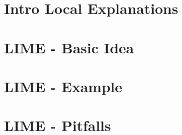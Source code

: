 \documentclass[11pt,compress,t,n
otes=noshow, aspectratio=169, xcolor=table]{beamer}
\begin{document}



% 
% 
% 

\section{Intro Local Explanations}


\section{LIME - Basic Idea}


\section{LIME - Example}


\section{LIME - Pitfalls}

\end{document}

